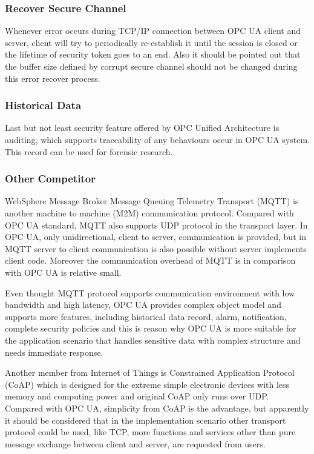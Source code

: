 \documentclass[]{llncs}
\begin{document}
\subsubsection{Recover Secure Channel}


Whenever error occurs during TCP/IP connection between OPC UA client and server, client will try to periodically re-establish it until the session is closed or the lifetime of security token goes to an end. Also it should be pointed out that the buffer size defined by corrupt secure channel should not be changed during this error recover process.

\subsubsection{Historical Data}
Last but not least security feature offered by OPC Unified Architecture is auditing, which supports traceability of any behaviours occur in OPC UA system. This record can be used for forensic research.


\subsubsection{Other Competitor}
WebSphere Message Broker Message Queuing Telemetry Transport (MQTT)\cite{Ref3} is another machine to machine (M2M) communication protocol. Compared with OPC UA standard, MQTT also supports UDP protocol in the transport layer. In OPC UA, only unidirectional, client to server, communication is provided, but in MQTT server to client communication is also possible without server implements client code. Moreover the communication overhead of MQTT is in comparison with OPC UA is relative small. 


Even thought MQTT protocol supports communication environment with low bandwidth and high latency, OPC UA provides complex object model and supports more features, including historical data record, alarm, notification, complete security policies and this is reason why OPC UA is more suitable for the application scenario that handles sensitive data with complex structure and needs immediate response.


Another member from Internet of Things is Constrained Application Protocol (CoAP)\cite{Ref5} which is designed for the extreme simple electronic devices with less memory and computing power and original CoAP only runs over UDP. Compared with OPC UA, simplicity from CoAP is the advantage, but apparently it should be considered that in the implementation scenario other transport protocol could be used, like TCP, more functions and services other than pure message exchange between client and server, are requested from users.
\end{document}
